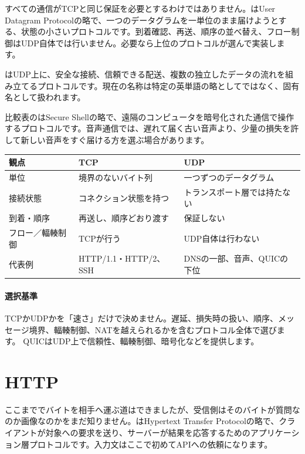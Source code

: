 すべての通信がTCPと同じ保証を必要とするわけではありません。はUser Datagram Protocolの略で、一つのデータグラムを一単位のまま届けようとする、状態の小さいプロトコルです。到着確認、再送、順序の並べ替え、フロー制御はUDP自体では行いません。必要なら上位のプロトコルが選んで実装します。

はUDP上に、安全な接続、信頼できる配送、複数の独立したデータの流れを組み立てるプロトコルです。現在の名称は特定の英単語の略としてではなく、固有名として扱われます。

比較表のはSecure Shellの略で、遠隔のコンピュータを暗号化された通信で操作するプロトコルです。音声通信では、遅れて届く古い音声より、少量の損失を許して新しい音声をすぐ届ける方を選ぶ場合があります。

\begingroup
  \noindent
  \begin{tabularx}{\textwidth}{@{}lYY@{}}
    \toprule
    観点 & TCP & UDP\\
    \midrule
    単位 & 境界のないバイト列 & 一つずつのデータグラム\\
    接続状態 & コネクション状態を持つ & トランスポート層では持たない\\
    到着・順序 & 再送し、順序どおり渡す & 保証しない\\
    フロー／輻輳制御 & TCPが行う & UDP自体は行わない\\
    代表例 & HTTP/1.1・HTTP/2、SSH & DNSの一部、音声、QUICの下位\\
    \bottomrule
  \end{tabularx}
  \vspace{4mm}
\paragraph{選択基準}
    TCPかUDPかを「速さ」だけで決めません。遅延、損失時の扱い、順序、メッセージ境界、輻輳制御、NATを越えられるかを含むプロトコル全体で選びます。
    QUICはUDP上で信頼性、輻輳制御、暗号化などを提供します。

\par
\endgroup


\section{HTTP}
\label{sec:05-network-14}

ここまででバイトを相手へ運ぶ道はできましたが、受信側はそのバイトが質問なのか画像なのかをまだ知りません。はHypertext Transfer Protocolの略で、クライアントが対象への要求を送り、サーバーが結果を応答するためのアプリケーション層プロトコルです。入力文はここで初めてAPIへの依頼になります。

